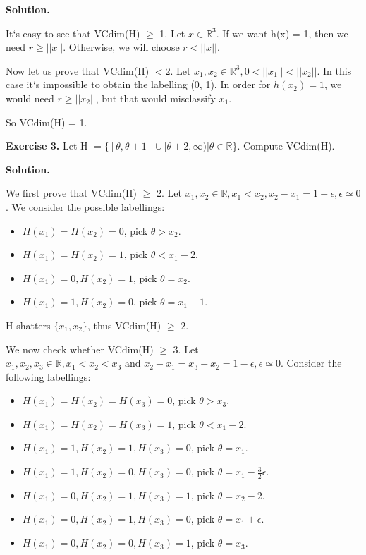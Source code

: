 \documentclass{article}
\newcommand{\<}{\langle}
\renewcommand{\>}{\rangle}
\theoremstyle{definition}
\begin{document}
\textbf{Solution.}

It`s easy to see that VCdim(H) $\geq$ 1. Let $x \in \mathbb{R}^3$. If we want h(x) = 1, then we need $r \geq ||x||$. Otherwise, we will choose $r < ||x||$.

Now let us prove that VCdim(H) $< 2$. Let $x_1, x_2 \in \mathbb{R}^3, 0<||x_1||<||x_2||$. In this case it`s impossible to obtain the labelling (0, 1). In order for $h(x_2) = 1$, we would need $r \geq ||x_2||$, but that would misclassify $x_1$.

So VCdim(H) = 1.

\vspace{3mm}

\textbf{Exercise 3.} Let H $= \{ [\theta, \theta +1] \cup [\theta+2, \infty)|\theta \in \mathbb{R}\}$. Compute VCdim(H).

\textbf{Solution.}

We first prove that VCdim(H) $\geq$ 2. Let $x_1, x_2 \in \mathbb{R}, x_1 < x_2, x_2 - x_1 = 1 - \epsilon, \epsilon \simeq 0$. We consider the possible labellings:

\begin{itemize}
    \item[] $H(x_1) = H(x_2) = 0$, pick $\theta > x_2$.
    \item[] $H(x_1) = H(x_2) = 1$, pick $\theta < x_1 - 2$.
    \item[] $H(x_1) = 0, H(x_2) = 1$, pick $\theta = x_2$.
    \item[] $H(x_1) = 1, H(x_2) = 0$, pick $\theta = x_1 - 1$.
\end{itemize}{}

H shatters $\{x_1, x_2\}$, thus VCdim(H) $\geq$ 2.

We now check whether VCdim(H) $\geq$ 3. Let $x_1, x_2, x_3 \in \mathbb{R}, x_1 < x_2 < x_3 \text{ and } x_2 - x_1 = x_3 - x_2 = 1 - \epsilon, \epsilon \simeq 0$. Consider the following labellings:

\begin{itemize}
    \item[] $H(x_1) = H(x_2) = H(x_3) = 0$, pick $\theta > x_3$.
    \item[] $H(x_1) = H(x_2) = H(x_3) = 1$, pick $\theta < x_1 - 2$.
    \item[] $H(x_1) = 1, H(x_2) = 1, H(x_3) = 0$, pick $\theta = x_1$.
    \item[] $H(x_1) = 1, H(x_2) = 0, H(x_3) = 0$, pick $\theta = x_1 - \frac{3}{2} \epsilon$.
    \item[] $H(x_1) = 0, H(x_2) = 1, H(x_3) = 1$, pick $\theta = x_2 - 2$.
    \item[] $H(x_1) = 0, H(x_2) = 1, H(x_3) = 0$, pick $\theta = x_1 + \epsilon$.
    \item[] $H(x_1) = 0, H(x_2) = 0, H(x_3) = 1$, pick $\theta = x_3$.
\end{itemize}{}
\end{document}
